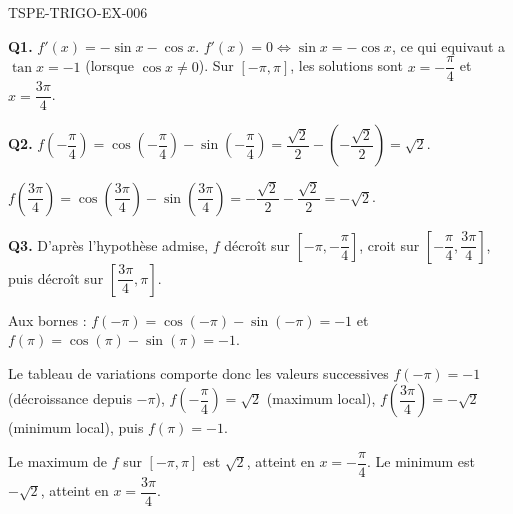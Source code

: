 \begin{corrige}{TSPE-TRIGO-EX-006}

\textbf{Q1.} $f'(x) = -\sin x - \cos x$. $f'(x) = 0 \iff \sin x = -\cos x$, ce qui equivaut a $\tan x = -1$ (lorsque $\cos x
\neq 0$). Sur $[-\pi,\pi]$, les solutions sont $x=-\dfrac{\pi}{4}$ et $x=\dfrac{3\pi}{4}$.

\textbf{Q2.} $f\!\left(-\dfrac{\pi}{4}\right) = \cos\!\left(-\dfrac{\pi}{4}\right) - \sin\!\left(-\dfrac{\pi}{4}\right) = \dfrac{\sqrt{2}}{2} - \left(-\dfrac{\sqrt{2}}{2}\right) = \sqrt{2}$.

$f\!\left(\dfrac{3\pi}{4}\right) = \cos\!\left(\dfrac{3\pi}{4}\right) - \sin\!\left(\dfrac{3\pi}{4}\right) = -\dfrac{\sqrt{2}}{2} - \dfrac{\sqrt{2}}{2} = -\sqrt{2}$.

\textbf{Q3.} D'après l'hypothèse admise, $f$ décroît sur $\left[-\pi,-\dfrac{\pi}{4}\right]$, croit sur $\left[-\dfrac{\pi}{4},\dfrac{3\pi}{4}\right]$, puis décroît sur $\left[\dfrac{3\pi}{4},\pi\right]$.

Aux bornes : $f(-\pi) = \cos(-\pi)-\sin(-\pi) = -1$ et $f(\pi) = \cos(\pi)-\sin(\pi) = -1$.

Le tableau de variations comporte donc les valeurs successives $f(-\pi)=-1$ (décroissance depuis $-\pi$), $f\!\left(-\dfrac{\pi}{4}\right)=\sqrt{2}$ (maximum local), $f\!\left(\dfrac{3\pi}{4}\right)=-\sqrt{2}$ (minimum local), puis $f(\pi)=-1$.

Le maximum de $f$ sur $[-\pi,\pi]$ est $\sqrt{2}$, atteint en $x=-\dfrac{\pi}{4}$. Le minimum est $-\sqrt{2}$, atteint en $x=\dfrac{3\pi}{4}$.

\end{corrige}
